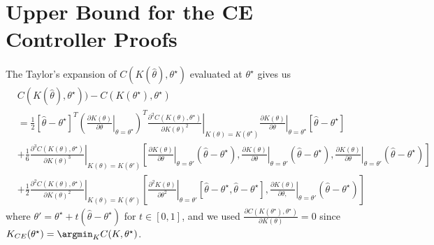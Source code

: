\section{Upper Bound for the CE Controller Proofs}
The Taylor's expansion of $C(K(\hat\theta), \theta^\star)$ evaluated at $\theta^\star$ gives us
\begin{align*}
    &C(K(\hat{\theta}), \theta^\star)) - C(K(\theta^\star), \theta^\star) \\ 
    &= \frac{1}{2}
    [\hat\theta - \theta^\star]^T\left(\left.\frac{\partial K(\theta)}{\partial \theta}\right|_{\theta = \theta^\star}\right)^T
    \left.\frac{\partial^2 C(K(\theta), \theta^\star)}{\partial K(\theta)^2}\right|_{K(\theta) = K(\theta^\star)}
    \left.\frac{\partial K(\theta)}{\partial \theta}\right|_{\theta = \theta^\star}
    [\hat{\theta} - \theta^\star] \\
    &+ \frac{1}{6}
    \left.\frac{\partial^3 C(K(\theta), \theta^\star)}{\partial K(\theta)^3}\right|_{K(\theta) = K(\theta')}
    \left[\left.\frac{\partial K(\theta)}{\partial \theta}\right|_{\theta = \theta'}
    (\hat{\theta} - \theta^\star), 
    \left.\frac{\partial K(\theta)}{\partial \theta}\right|_{\theta = \theta'}(\hat{\theta} - \theta^\star), 
    \left.\frac{\partial K(\theta)}{\partial \theta}\right|_{\theta = \theta'}(\hat{\theta} - \theta^\star)\right] \\
    &+ \frac{1}{2}
    \left.\frac{\partial^2 C(K(\theta), \theta^\star)}{\partial K(\theta)^2}\right|_{K(\theta) = K(\theta')}
    \left[\left.\frac{\partial^2 K(\theta)}{\partial \theta^2}\right|_{\theta = \theta'}
    [\hat{\theta} - \theta^\star,\hat{\theta} - \theta^\star] ,
    \left.\frac{\partial K(\theta)}{\partial \theta,}\right|_{\theta = \theta'}(\hat{\theta} - \theta^\star)\right] 
\end{align*}
where $\theta' = \theta^\star + t(\hat\theta - \theta^\star)$ for $t\in[0,1]$, and we used $\frac{\partial C(K(\theta^\star), \theta^\star)}{\partial K(\theta)}= 0$ since $K_{CE}(\theta^\star) = \argmin_KC(K, \theta^\star)$.

